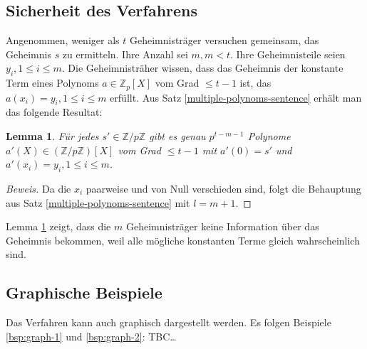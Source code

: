 \documentclass[12pt, a4paper, oneside, titlepage]{report}
\newcommand{\Z}{\mathds{Z}}
\newtheorem{lemma}{Lemma}[section]
\newenvironment{bew}{\begin{proof}[Beweis]}{\end{proof}}
\theoremstyle{definition}
\begin{document}
	\subsection{Sicherheit des Verfahrens}
	
	Angenommen, weniger als $ t $ Geheimnisträger versuchen gemeinsam, das Geheimnis $ s $ zu ermitteln. Ihre Anzahl sei $ m, m < t $. Ihre Geheimnisteile seien $ y_i, 1 \leq i \leq m $. Die Geheimnisträher wissen, dass das Geheimnis der konstante Term eines Polynoms $ a \in \Z_p[X] $ vom Grad $ \leq t - 1 $ ist, das $ a(x_i) = y_i, 1 \leq i \leq m $ erfüllt. Aus Satz \ref{multiple-polynoms-sentence} erhält man das folgende Resultat:
	
	\begin{lemma}\label{lemma-multiple-possibilities}
		Für jedes $ s' \in \Z / p \Z $ gibt es genau $ p^{t-m-1} $ Polynome $ a'(X) \in (\Z / p \Z)[X] $ vom Grad $ \leq t - 1 $ mit $ a'(0) = s' $ und $ a'(x_i) = y_i, 1 \leq i \leq m $.
	\end{lemma}

	\begin{bew}
		Da die $ x_i $ paarweise und von Null verschieden sind, folgt die Behauptung aus Satz \ref{multiple-polynoms-sentence} mit $ l = m + 1 $.
	\end{bew}

	Lemma \ref{lemma-multiple-possibilities} zeigt, dass die $ m $ Geheimnisträger keine Information über das Geheimnis bekommen, weil alle mögliche konstanten Terme gleich wahrscheinlich sind.
	\subsection{Graphische Beispiele}
		Das Verfahren kann auch graphisch dargestellt werden. Es folgen Beispiele \ref{bsp:graph-1} und \ref{bsp:graph-2}: TBC\dots %
		\pagebreak
\end{document}
